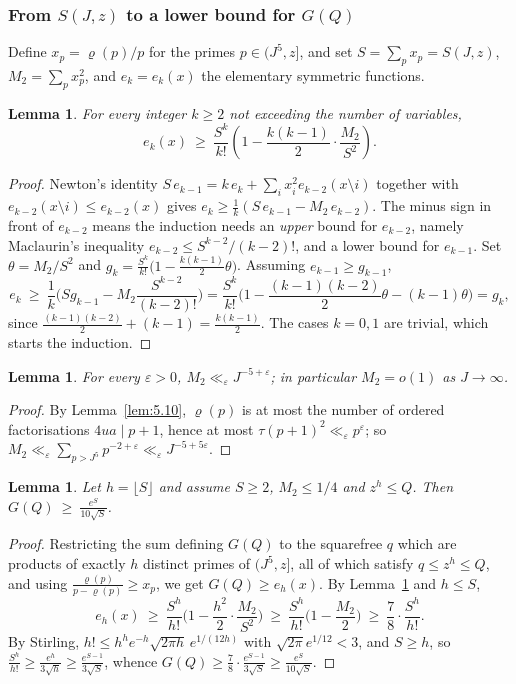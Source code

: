 \documentclass[11pt, a4paper]{article}
\theoremstyle{plain}
\newtheorem{lemma}[theorem]{Lemma}
\theoremstyle{definition}
\begin{document}
\subsubsection{From $S(J,z)$ to a lower bound for $G(Q)$} \label{sec:5.2.3}

Define $x_p = \varrho(p)/p$ for the primes $p\in(J^{5},z]$, and set $S=\sum_p x_p=S(J,z)$, $M_2=\sum_p x_p^{2}$, and $e_k=e_k(x)$ the elementary symmetric functions.

\begin{lemma} \label{lem:5.7}
For every integer $k\ge2$ not exceeding the number of variables,
$$e_k(x) \ \ge\ \frac{S^k}{k!}\left(1 - \frac{k(k-1)}{2}\cdot\frac{M_2}{S^2}\right).$$
\end{lemma}
\begin{proof}
Newton's identity $S\,e_{k-1}=k\,e_k+\sum_i x_i^{2}e_{k-2}(x\setminus i)$ together with $e_{k-2}(x\setminus i)\le e_{k-2}(x)$ gives $e_k \ge \frac{1}{k}(S\,e_{k-1} - M_2\,e_{k-2})$. The minus sign in front of $e_{k-2}$ means the induction needs an \emph{upper} bound for $e_{k-2}$, namely Maclaurin's inequality $e_{k-2}\le S^{k-2}/(k-2)!$, and a lower bound for $e_{k-1}$. Set $\theta=M_2/S^{2}$ and $g_k=\frac{S^{k}}{k!}\big(1-\frac{k(k-1)}{2}\theta\big)$. Assuming $e_{k-1}\ge g_{k-1}$,
$$e_k\ \ge\ \frac1k\Big(S g_{k-1}-M_2\frac{S^{k-2}}{(k-2)!}\Big)
=\frac{S^{k}}{k!}\Big(1-\frac{(k-1)(k-2)}{2}\theta-(k-1)\theta\Big)=g_k,$$
since $\frac{(k-1)(k-2)}{2}+(k-1)=\frac{k(k-1)}{2}$. The cases $k=0,1$ are trivial, which starts the induction.
\end{proof}

\begin{lemma} \label{lem:5.8}
For every $\varepsilon>0$, $M_2\ll_\varepsilon J^{-5+\varepsilon}$; in particular $M_2=o(1)$ as $J\to\infty$.
\end{lemma}
\begin{proof}
By Lemma~\ref{lem:5.10}, $\varrho(p)$ is at most the number of ordered factorisations $4ua\mid p+1$, hence at most $\tau(p+1)^{2}\ll_\varepsilon p^{\varepsilon}$; so $M_2 \ll_\varepsilon \sum_{p>J^{5}}p^{-2+\varepsilon}\ll_\varepsilon J^{-5+5\varepsilon}$.
\end{proof}

\begin{lemma} \label{lem:5.9}
Let $h=\lfloor S\rfloor$ and assume $S\ge2$, $M_2\le1/4$ and $z^{h}\le Q$. Then $G(Q)\ \ge\ \frac{e^{S}}{10\sqrt{S}}$.
\end{lemma}
\begin{proof}
Restricting the sum defining $G(Q)$ to the squarefree $q$ which are products of exactly $h$ distinct primes of $(J^{5},z]$, all of which satisfy $q\le z^{h}\le Q$, and using $\frac{\varrho(p)}{p-\varrho(p)}\ge x_p$, we get $G(Q)\ge e_h(x)$. By Lemma~\ref{lem:5.7} and $h\le S$,
$$e_h(x)\ \ge\ \frac{S^{h}}{h!}\Big(1-\frac{h^{2}}{2}\cdot\frac{M_2}{S^{2}}\Big)\ \ge\ \frac{S^{h}}{h!}\Big(1-\frac{M_2}{2}\Big)\ \ge\ \frac78\cdot\frac{S^{h}}{h!} .$$
By Stirling, $h!\le h^{h}e^{-h}\sqrt{2\pi h}\,e^{1/(12h)}$ with $\sqrt{2\pi}e^{1/12}<3$, and $S\ge h$, so $\frac{S^{h}}{h!}\ge\frac{e^{h}}{3\sqrt{h}}\ge\frac{e^{S-1}}{3\sqrt S}$, whence $G(Q)\ge\frac78\cdot\frac{e^{S-1}}{3\sqrt S}\ge\frac{e^{S}}{10\sqrt S}$.
\end{proof}
\end{document}
